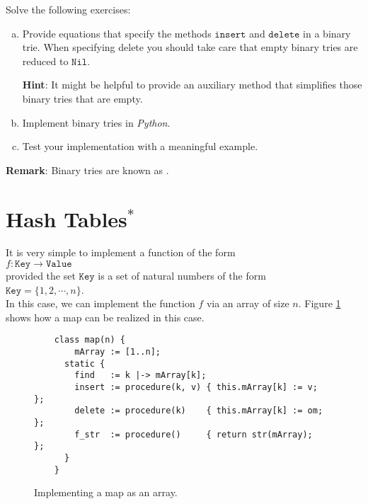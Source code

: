 Solve the following exercises:
\begin{enumerate}[(a)]
\item Provide equations that specify the methods $\texttt{insert}$ and $\texttt{delete}$ in a binary trie.
      When specifying delete you should take care that empty binary tries are reduced to
      $\texttt{Nil}$.

      \textbf{Hint}:  It might be helpful to provide an auxiliary method that simplifies those binary tries
      that are empty. 
\item Implement binary tries in \textsl{Python}.
\item Test your implementation with a meaningful example.
\end{enumerate}
\textbf{Remark}: Binary tries are known as .  \eox

\section{Hash Tables$^*$}
It is very simple to implement a function of the form \\[0.2cm]
\hspace*{1.3cm} $f: \texttt{Key} \rightarrow \texttt{Value}$ \\[0.2cm]
provided the set $\texttt{Key}$ is a set of natural numbers of the form  \\[0.2cm]
\hspace*{1.3cm} $\texttt{Key} = \{ 1, 2, \cdots, n \}$. \\[0.2cm]
In this case, we can implement the function $f$ via an array of size $n$.
Figure \ref{fig:map-array.ipython} shows how a map can be realized in this case.

\begin{figure}[!ht]
\centering
\begin{verbatim}
    class map(n) {
        mArray := [1..n];
      static {
        find   := k |-> mArray[k];
        insert := procedure(k, v) { this.mArray[k] := v;  };
        delete := procedure(k)    { this.mArray[k] := om; };
        f_str  := procedure()     { return str(mArray);   };
      }
    }
\end{verbatim}
\vspace*{-0.3cm}
\caption{Implementing a map as an array.}
\label{fig:map-array.ipython}
\end{figure}




